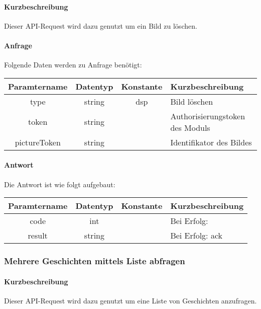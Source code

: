 \paragraph{Kurzbeschreibung}Dieser API-Request wird dazu genutzt um ein Bild zu löschen.
\paragraph{Anfrage}Folgende Daten werden zu Anfrage benötigt:
\begin{table}[H]
	\begin{tabular}{|c|c|c|p{6.5cm}|}
		\hline
		\textbf{Paramtername} & \textbf{Datentyp} & \textbf{Konstante} & \textbf{Kurzbeschreibung}                                                                                               \\ \hline
		type                & string            & dsp                & Bild löschen \\ \hline
		token               & string            &                    & Authorisierungstoken des Moduls \\ \hline
		pictureToken        & string            &                    & Identifikator des Bildes \\ \hline
	\end{tabular}
\end{table}
\paragraph{Antwort}Die Antwort ist wie folgt aufgebaut:
\begin{table}[H]
	\begin{tabular}{|c|c|c|p{6.5cm}|}
		\hline
		\textbf{Paramtername} & \textbf{Datentyp} & \textbf{Konstante} & \textbf{Kurzbeschreibung}            \\ \hline                
		code                & int              &                 & Bei Erfolg: {\glqq 0\grqq} \\ \hline
		result              & string           &                 & Bei Erfolg: {\glqq ack\grqq} \\ \hline
	\end{tabular}
\end{table}
\subsubsection{Mehrere Geschichten mittels Liste abfragen}
\paragraph{Kurzbeschreibung}Dieser API-Request wird dazu genutzt um eine Liste von Geschichten anzufragen.
